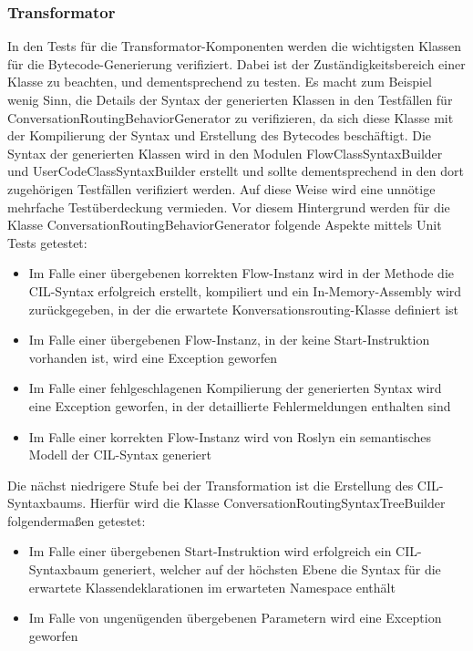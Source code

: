 \subsubsection{Transformator}  
In den Tests für die Transformator-Komponenten werden die wichtigsten Klassen für die Bytecode-Generierung verifiziert. Dabei ist der Zuständigkeitsbereich einer Klasse zu beachten, und dementsprechend zu testen. Es macht zum Beispiel wenig Sinn, die Details der Syntax der generierten Klassen in den Testfällen für ConversationRoutingBehaviorGenerator zu verifizieren, da sich diese Klasse mit der Kompilierung der Syntax und Erstellung des Bytecodes beschäftigt. Die Syntax der generierten Klassen wird in den Modulen FlowClassSyntaxBuilder und UserCodeClassSyntaxBuilder erstellt und sollte dementsprechend in den dort zugehörigen Testfällen verifiziert werden. Auf diese Weise wird eine unnötige mehrfache Testüberdeckung vermieden. Vor diesem Hintergrund werden für die Klasse ConversationRoutingBehaviorGenerator folgende Aspekte mittels Unit Tests getestet: 

\begin{itemize}
\item Im Falle einer übergebenen korrekten Flow-Instanz wird in der Methode die CIL-Syntax erfolgreich erstellt, kompiliert und ein In-Memory-Assembly wird zurückgegeben, in der die erwartete Konversationsrouting-Klasse definiert ist
\item Im Falle einer übergebenen Flow-Instanz, in der keine Start-Instruktion vorhanden ist, wird eine Exception geworfen
\item Im Falle einer fehlgeschlagenen Kompilierung der generierten Syntax wird eine Exception geworfen, in der detaillierte Fehlermeldungen enthalten sind
\item Im Falle einer korrekten Flow-Instanz wird von Roslyn ein semantisches Modell der CIL-Syntax generiert
\end{itemize} 

Die nächst niedrigere Stufe bei der Transformation ist die Erstellung des CIL-Syntaxbaums. Hierfür wird die Klasse ConversationRoutingSyntaxTreeBuilder folgendermaßen getestet:

\begin{itemize}
\item Im Falle einer übergebenen Start-Instruktion wird erfolgreich ein CIL-Syntaxbaum generiert, welcher auf der höchsten Ebene die Syntax für die erwartete Klassendeklarationen im erwarteten Namespace enthält
\item Im Falle von ungenügenden übergebenen Parametern wird eine Exception geworfen
\end{itemize}

